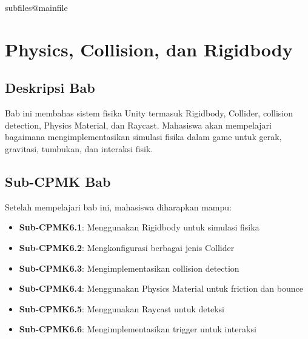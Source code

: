\documentclass[../../main.tex]{subfiles}
\begin{document}
\ifcsname subfiles@mainfile\endcsname\else
    \setcounter{chapter}{5}
\fi
\chapter{Physics, Collision, dan Rigidbody}

\section{Deskripsi Bab}

Bab ini membahas sistem fisika Unity termasuk Rigidbody, Collider, collision detection, Physics Material, dan Raycast. Mahasiswa akan mempelajari bagaimana mengimplementasikan simulasi fisika dalam game untuk gerak, gravitasi, tumbukan, dan interaksi fisik.

\section{Sub-CPMK Bab}

Setelah mempelajari bab ini, mahasiswa diharapkan mampu:
\begin{itemize}
\item \textbf{Sub-CPMK6.1}: Menggunakan Rigidbody untuk simulasi fisika
\item \textbf{Sub-CPMK6.2}: Mengkonfigurasi berbagai jenis Collider
\item \textbf{Sub-CPMK6.3}: Mengimplementasikan collision detection
\item \textbf{Sub-CPMK6.4}: Menggunakan Physics Material untuk friction dan bounce
\item \textbf{Sub-CPMK6.5}: Menggunakan Raycast untuk deteksi
\item \textbf{Sub-CPMK6.6}: Mengimplementasikan trigger untuk interaksi
\end{itemize}










\end{document}
